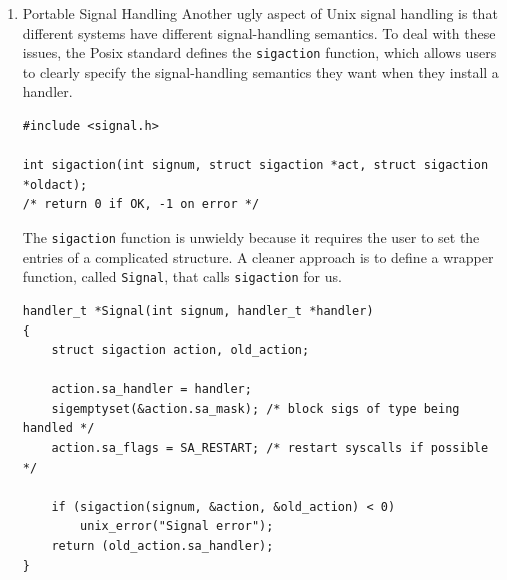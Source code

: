 \documentclass[11pt]{article}
\begin{document}
\begin{enumerate}
\begin{verbatim}
  printf("parent processing intput\n");
  while (1)
    ;

  exit(0);
}

\end{verbatim}



\begin{verbatim}
(base) chyson@chyson c8-exceptions % ./signal2 
Hello from child 17889
Hello from child 17890
Hello from child 17891
Handler reaped child 17891
Handler reaped child 17890
Handler reaped child 17889
cr
parent processing intput
^Z
zsh: suspended  ./signal2
\end{verbatim}

\noindent\rule{\textwidth}{0.5pt}


\item Portable Signal Handling
\label{sec:orgc7bbd09}
Another ugly aspect of Unix signal handling is that different systems have different signal-handling semantics. To deal with these issues, the Posix standard defines the \texttt{sigaction} function, which allows users to clearly specify the signal-handling semantics they want when they install a handler.\\

\begin{verbatim}
#include <signal.h>

int sigaction(int signum, struct sigaction *act, struct sigaction *oldact);
/* return 0 if OK, -1 on error */
\end{verbatim}

The \texttt{sigaction} function is unwieldy because it requires the user to set the entries of a complicated structure. A cleaner approach is to define a wrapper function, called \texttt{Signal}, that calls \texttt{sigaction} for us.\\

\begin{verbatim}
handler_t *Signal(int signum, handler_t *handler) 
{
    struct sigaction action, old_action;

    action.sa_handler = handler;  
    sigemptyset(&action.sa_mask); /* block sigs of type being handled */
    action.sa_flags = SA_RESTART; /* restart syscalls if possible */

    if (sigaction(signum, &action, &old_action) < 0)
        unix_error("Signal error");
    return (old_action.sa_handler);
}
\end{verbatim}


\end{enumerate}
\end{document}
